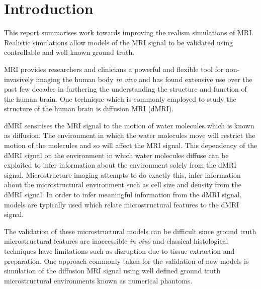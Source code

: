 

\graphicspath{ {src/} }






\newcommand{\titleinfo}{Simulations of diffusion MR (get proper title) }



\chapter{Introduction}
\label{sec:introduction}

This report summarises work towards improving the realism simulations of \ac{MRI}. Realistic simulations allow models of the MRI signal to be validated using controllable and well known ground truth. 

MRI provides researchers and clinicians a powerful and flexible tool for non-invasively imaging the human body \emph{in vivo} and has found extensive use over the past few decades in furthering the understanding the structure and function of the human brain.
One technique which is commonly employed to study the structure of the human brain is diffusion MRI (dMRI).

dMRI sensitises the MRI signal to the motion of water molecules which is known as diffusion.
The environment in which the water molecules move will restrict the motion of the molecules and so will affect the MRI signal. 
This dependency of the dMRI signal on the environment in which water molecules diffuse can be exploited to infer information about the environment solely from the dMRI signal.  
Microstructure imaging attempts to do exactly this, infer information about the microstructural environment such as cell size and density from the dMRI signal.
In order to infer meaningful information from the dMRI signal, models are typically used which relate microstructural features to the dMRI signal.

The validation of these microstructural models can be difficult since ground truth microstructural features are inaccessible \emph{in vivo} and classical histological techniques have limitations such as disruption due to tissue extraction and preparation. 
One approach commonly taken for the validation of new models is simulation of the diffusion MRI signal using well defined ground truth microstructural environments known as numerical phantoms. 

